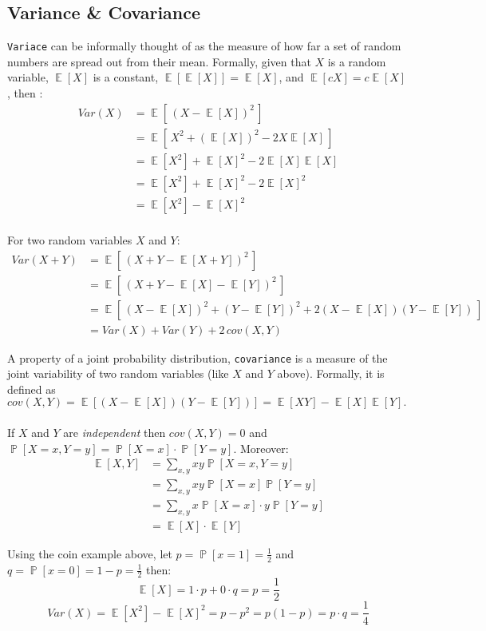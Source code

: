 \documentclass[twoside]{article}
\DeclareMathOperator{\E}{\mathbb{E}}
\DeclareMathOperator{\Prob}{\mathbb{P}}
\begin{document}
\subsection{Variance \& Covariance}
{\tt Variace} can be informally thought of as the measure of how far a set of random numbers are spread out from their mean. Formally, given that $X$ is a random variable, $\E[X]$ is a constant, $\E[\E[X]]=\E[X]$, and $\E[cX] = c\E[X]$, then :
\begin{align*} 
Var(X) &= \E[\,(X-\E[X])^2\,] \\
&= \E[\,X^2 +(\E[X])^2 - 2X\E[X]\,] \\
&= \E[X^2] + \E[X]^2 - 2\E[X]\E[X] \\
&= \E[X^2] + \E[X]^2 - 2\E[X]^2 \\
&= \E[X^2] -\E[X]^2
\end{align*}
\\
For two random variables $X$ and $Y$:
\begin{align*} 
Var(X+Y) &= \E[\,(X+Y-\E[X+Y])^2\,] \\
&= \E[\,(X+Y-\E[X]-\E[Y])^2\,] \\
&= \E[\,(X-\E[X])^2 + (Y-\E[Y])^2 + 2(X-\E[X])(Y-\E[Y])\,] \\
&= Var(X)+Var(Y)+2\,cov(X,Y)
\end{align*}

A property of a joint probability distribution, {\tt covariance} is a measure of the joint variability of two random variables (like $X$ and $Y$ above). Formally, it is defined as $cov(X,Y) = \E[(X-\E[X])(Y-\E[Y])] = \E[XY] - \E[X]\E[Y] .$ \\ \\
If $X$ and $Y$ are {\em independent} then $cov(X,Y) = 0$ and $\Prob[X=x,Y=y] = \Prob[X=x] \cdot \Prob[Y=y]$. Moreover:
\begin{align*} 
\E[X,Y] &= \sum_{x,y} xy\Prob[X=x,Y=y]\\
 &= \sum_{x,y} xy\Prob[X=x]\Prob[Y=y]\\
 &= \sum_{x,y} x\Prob[X=x]\cdot y\Prob[Y=y]\\
 &= \E[X]\cdot\E[Y] 
\end{align*}

Using the coin example above, let $p=\Prob[x=1]=\frac{1}{2}$ and $q=\Prob[x=0]=1-p=\frac{1}{2}$ then:	
\[\E[X] = 1\cdot p + 0\cdot q = p =	\frac{1}{2}\]
\[Var(X) = \E[X^2]- \E[X]^2 = p-p^2 = p(1-p) = p\cdot q	= \frac{1}{4}\]
\end{document}
